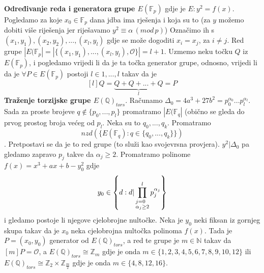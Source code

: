 \documentclass[12pt, a4paper]{article}
\begin{document}
\begin{multicols}{3}
\noindent
\scriptsize
\textbf{Određivanje reda i generatora grupe $E(\mathbb{F}_p)$} gdje je $E : y^2=f(x)$. Pogledamo za koje $x_0 \in \mathbb{F}_p$ dana jdba ima rješenja i koja su to (za $y$ možemo dobiti više riješenja jer riješavamo $y^2\equiv \alpha \, (mod \, p)$) Označimo ih s $(x_1,y_1), (x_2, y_2),...,(x_l,y_l)$ gdje se može dogoditi $x_i=x_j$, za $i \neq j$. Red grupe $|E(\mathbb{F}_p|=|\{(x_1,y_1),...,(x_l,y_l), \mathcal{O}\}|=l+1$. Uzmemo neku točku $Q$ iz $E(\mathbb{F}_p)$, i pogledamo vrijedi li da je ta točka generator grupe, odnosno, vrijedi li da je $\forall P \in E(\mathbb{F}_p)$ postoji $l \in {1,...,l}$ takav da je \[[l]Q=\underbrace{Q+Q+...+Q}_l=P\]
\textbf{Traženje torzijske grupe $E(\mathbb{Q})_{tors}$}. Računamo $\Delta_0=4a^3 +27b^2 = p_0^{\alpha_0}...p_l^{\alpha_l}$. Sada za  proste brojeve $q \not\in \{p_0,...,p_l\}$ promatramo $|E(\mathbb{F}_q|$ (obično se gleda do prvog prostog broja većeg od $p_l$. Neka su to $q_0,...,q_k$. Promatramo \[nzd(\{E(\mathbb{F}_q) : q \in \{q_0,..., q_k\}\})\]. Pretpostavi se da je to red grupe (to služi kao svojevrsna provjera). $y^2| \Delta_0$ pa gledamo zapravo $p_j$ takve da  $\alpha_j \geq 2$. Promatramo polinome $f(x)=x^3+ax+b-y_0^2$ gdje 
\[y_0 \in \left\{d: d| \prod_{\begin{subarray}{l} j=0\\ \alpha_j \geq 2 \end{subarray}}^l p_j^{\alpha_j}\right\}\]
i gledamo postoje li njegove cjelobrojne nultočke. Neka je $y_0$ neki fiksan iz gornjeg skupa takav da je $x_0$ neka cjelobrojna nultočka polinoma $f(x)$. Tada je $P=(x_0, y_0)$ generator od $E(\mathbb{Q})_{tors}$, a red te grupe je $m \in \mathbb{N}$ takav da $[m]P=\mathcal{O}$, a $E(\mathbb{Q})_{tors}\cong \mathbb{Z}_m$ gdje je onda $m \in \{1,2,3,4,5,6,7,8,9,10,12\}$ ili   $E(\mathbb{Q})_{tors}\cong\mathbb{Z}_2 \times \mathbb{Z}_{\frac{m}{2}}$ gdje je onda $m \in \{4,8,12,16\}$.
\end{multicols}
\end{document}
